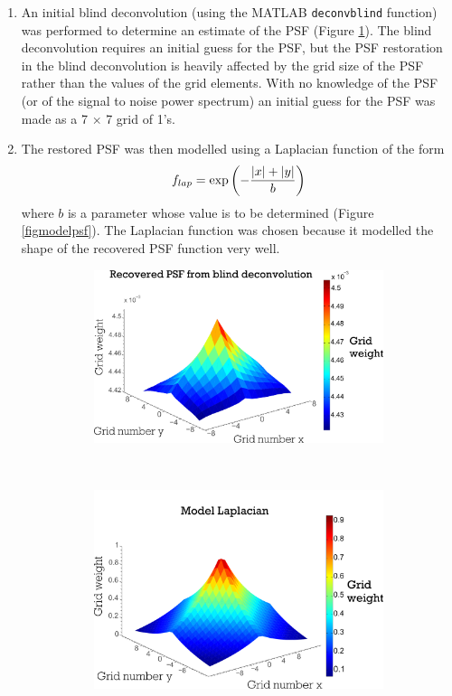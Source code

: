 \begin{enumerate}
\item An initial blind deconvolution (using the MATLAB \verb+deconvblind+ function) was performed to determine an estimate of the PSF (Figure \ref{figpsf}). The blind deconvolution requires an initial guess for the PSF, but the PSF restoration in the blind deconvolution is heavily affected by the grid size of the PSF rather than the values of the grid elements. With no knowledge of the PSF (or of the signal to noise power spectrum) an initial guess for the PSF was made as a 7 $\times$ 7 grid of 1's.
\item The restored PSF was then modelled using a Laplacian function of the form
\begin{equation}
f_{lap} = \exp \left(-\frac{|x| + |y|}{b}\right)
\label{eqlap}
\end{equation}
where $b$ is a parameter whose value is to be determined (Figure \ref{figmodelpsf}). The Laplacian function was chosen because it modelled the shape of the recovered PSF function very well.
\begin{figure}
        \centering
        \begin{subfigure}[b]{0.9\textwidth}
                \centering
                \includegraphics[width=\textwidth]{figures/beam/Initial_psf.pdf}
                \caption{}
                \label{figpsf}
        \end{subfigure}
				\\
        \begin{subfigure}[b]{0.9\textwidth}
                \centering
                \includegraphics[width=\textwidth]{figures/beam/model_psf.pdf}

\end{subfigure}
\end{figure}
\end{enumerate}
